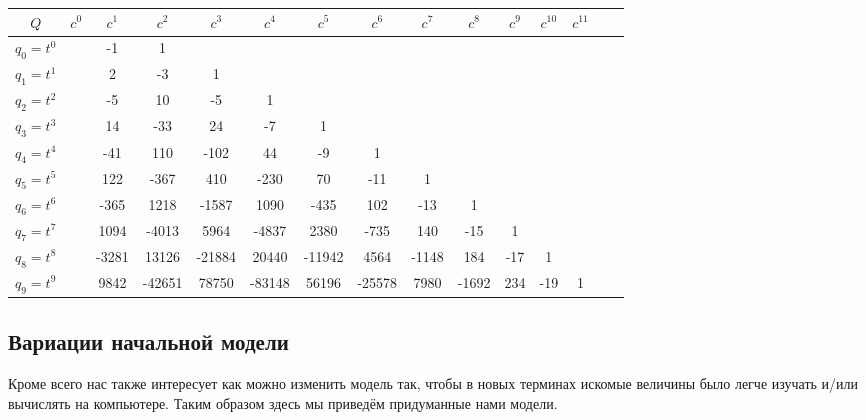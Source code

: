 \documentclass[12pt,a4paper]{article}
\begin{document}
\begin{example}
\begin{table}[H]
            \vspace*{10pt}
            \begin{tabular}{c||c|c|c|c|c|c|c|c|c|c|c|c|c|c}
                $Q$& $c^0$& $c^1$& $c^2$& $c^3$& $c^4$& $c^5$& $c^6$& $c^7$& $c^8$& $c^9$& $c^{10}$& $c^{11}$\\
                \hline
                \hline
                $q_0 = t^0$&& -1& 1&&&&&&&&&\\
                \hline
                $q_1 = t^1$&& 2& -3& 1&&&&&&&&\\
                \hline
                $q_2 = t^2$&& -5& 10& -5& 1&&&&&&&\\
                \hline
                $q_3 = t^3$&& 14& -33& 24& -7& 1&&&&&&\\
                \hline
                $q_4 = t^4$&& -41& 110& -102& 44& -9& 1&&&&&\\
                \hline
                $q_5 = t^5$&& 122& -367& 410& -230& 70& -11& 1&&&&\\
                \hline
                $q_6 = t^6$&& -365& 1218& -1587& 1090& -435& 102& -13& 1&&&\\
                \hline
                $q_7 = t^7$&& 1094& -4013& 5964& -4837& 2380& -735& 140& -15& 1&&\\
                \hline
                $q_8 = t^8$&& -3281& 13126& -21884& 20440& -11942& 4564& -1148& 184& -17& 1&\\
                \hline
                $q_9 = t^9$&& 9842& -42651& 78750& -83148& 56196& -25578& 7980& -1692& 234& -19& 1\\
            \end{tabular}
        \end{table}
    \end{example}


    \subsection{Вариации начальной модели}

    Кроме всего нас также интересует как можно изменить модель так, чтобы в новых терминах искомые величины было легче изучать и/или вычислять на компьютере. Таким образом здесь мы приведём придуманные нами модели.
\end{document}
